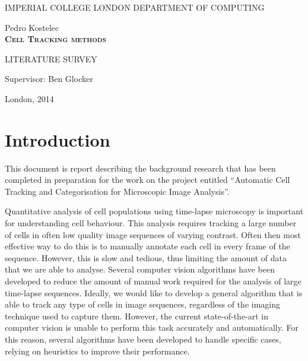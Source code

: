 \documentclass[12pt,a4paper,openany]{book}
\begin{document}
\thispagestyle{empty} 

\begin{center}
{\large 
IMPERIAL COLLEGE LONDON
DEPARTMENT OF COMPUTING\\
}

\vspace{3cm}
{\LARGE Pedro Kostelec}\\

\vspace{2cm}
\textsc{\textbf{\LARGE 
Cell Tracking methods 
}}

\vspace{2cm}
{ LITERATURE SURVEY }

\vspace{2cm} 
{\Large Supervisor: Ben Glocker}

\vfill
{\Large London, 2014}
\end{center}



\thispagestyle{empty}

\newpage




\renewcommand\thepage{} 
\tableofcontents 
\renewcommand\thepage{\arabic{page}}

\thispagestyle{empty}

\chapter{Introduction}
This document is report describing the background research that has been completed in preparation for the work on the project entitled ``Automatic Cell Tracking and Categorisation for Microscopic Image Analysis''.

Quantitative analysis of cell populations using time-lapse microscopy is important for understanding cell behaviour. This analysis requires tracking a large number of cells in often low quality image sequences of varying contrast. Often then most effective way to do this is to manually annotate each cell in every frame of the sequence. However, this is slow and tedious, thus limiting the amount of data that we are able to analyse. Several computer vision algorithms have been developed to reduce the amount of manual work required for the analysis of large time-lapse sequences. Ideally, we would like to develop a general algorithm that is able to track any type of cells in image sequences, regardless of the imaging technique used to capture them. However, the current state-of-the-art in computer vision is unable to perform this task accurately and automatically. For this reason, several algorithms have been developed to handle specific cases, relying on heuristics to improve their performance.
\end{document}
